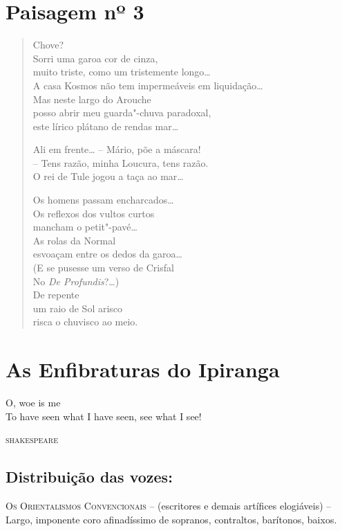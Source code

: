 \chapter{Paisagem nº 3}

\begin{verse}
Chove?\\
Sorri uma garoa cor de cinza,\\
muito triste, como um tristemente longo\ldots{}\\
A casa Kosmos não tem impermeáveis em liquidação\ldots{}\\
Mas neste largo do Arouche\\
posso abrir meu guarda"-chuva paradoxal,\\
este lírico plátano de rendas mar\ldots{}

Ali em frente\ldots{} -- Mário, põe a máscara!\\
-- Tens razão, minha Loucura, tens razão.\\
O rei de Tule jogou a taça ao mar\ldots{}

Os homens passam encharcados\ldots{}\\
Os reflexos dos vultos curtos\\
mancham o petit"-pavé\ldots{}\\
As rolas da Normal\\
esvoaçam entre os dedos da garoa\ldots{}\\
(E se pusesse um verso de Crisfal\\
No \emph{De Profundis}?\ldots{})\\
De repente\\
um raio de Sol arisco\\
risca o chuvisco ao meio.
\end{verse}

\chapter[As Enfibraturas do Ipiranga]{As Enfibraturas do Ipiranga }


\epigraph{O, woe is me\\
To have seen what I have seen, see what I see!}{\textsc{shakespeare}}

\section*{Distribuição das vozes:}

\textsc{Os Orientalismos Convencionais} -- (escritores e demais
artífices elogiáveis) -- Largo, imponente coro afinadíssimo de sopranos,
contraltos, barítonos, baixos.

